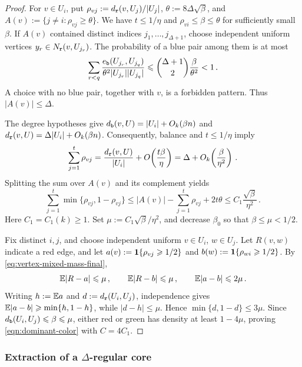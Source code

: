 \begin{proof}
For $v\in U_i$, put $\rho_{vj}:=d_{\normalfont\texttt r}(v,U_j)/|U_j|$, $\theta:=8\Delta\sqrt\beta$, and $A(v):=\{j\neq i:\rho_{vj}\geq\theta\}$. We have $t\leq1/\eta$ and $\rho_{vi}\leq\beta\leq\theta$ for sufficiently small $\beta$. If $A(v)$ contained distinct indices $j_1,\dots,j_{\Delta+1}$, choose independent uniform vertices $y_r\in N_{\normalfont\texttt r}(v,U_{j_r})$. The probability of a blue pair among them is at most
$$\sum_{r<q}\frac{e_{\normalfont\texttt b}(U_{j_r},U_{j_q})}{\theta^2|U_{j_r}||U_{j_q}|}\leqslant\binom{\Delta+1}{2}\frac\beta{\theta^2}<1\,.$$
A choice with no blue pair, together with $v$, is a forbidden pattern. Thus $|A(v)|\leq\Delta$.

The degree hypotheses give $d_{\normalfont\texttt b}(v,U)=|U_i|+O_k(\beta n)$ and $d_{\normalfont\texttt r}(v,U)=\Delta|U_i|+O_k(\beta n)$. Consequently, balance and $t\leq1/\eta$ imply
$$\sum_{j=1}^t\rho_{vj}=\frac{d_{\normalfont\texttt r}(v,U)}{|U_i|}+O\!\left(\frac{t\beta}{\eta}\right)=\Delta+O_k\!\left(\frac\beta{\eta^2}\right)\,.$$
Splitting the sum over $A(v)$ and its complement yields
\begin{equation}\label{eq:vertex-mixed-mass-final}
\sum_{j=1}^t\min\{\rho_{vj},1-\rho_{vj}\}\leq |A(v)|-\sum_{j=1}^t\rho_{vj}+2t\theta\leq C_1\frac{\sqrt\beta}{\eta^2}\,.
\end{equation}
Here $C_1=C_1(k)\geq1$. Set $\mu:=C_1\sqrt\beta/\eta^2$, and decrease $\beta_0$ so that $\beta\leq\mu<1/2$.

Fix distinct $i,j$, and choose independent uniform $v\in U_i$, $w\in U_j$. Let $R(v,w)$ indicate a red edge, and let $a(v):=\boldsymbol{1}\{\rho_{vj}\geqslant1/2\}$ and $b(w):=\boldsymbol{1}\{\rho_{wi}\geqslant1/2\}$. By \eqref{eq:vertex-mixed-mass-final},
$${\mathbb E}|R-a|\leqslant\mu\,,\qquad{\mathbb E}|R-b|\leqslant\mu\,,\qquad{\mathbb E}|a-b|\leqslant2\mu\,.$$
Writing $h:={\mathbb E} a$ and $d:=d_{\normalfont\texttt r}(U_i,U_j)$, independence gives ${\mathbb E}|a-b|\geqslant\min\{h,1-h\}$, while $|d-h|\leq\mu$. Hence $\min\{d,1-d\}\leq3\mu$. Since $d_{\normalfont\texttt b}(U_i,U_j)\leqslant\beta\leqslant\mu$, either red or green has density at least $1-4\mu$, proving \eqref{eqn:dominant-color} with $C=4C_1$.
\end{proof}

\subsubsection{Extraction of a $\Delta$-regular core}

